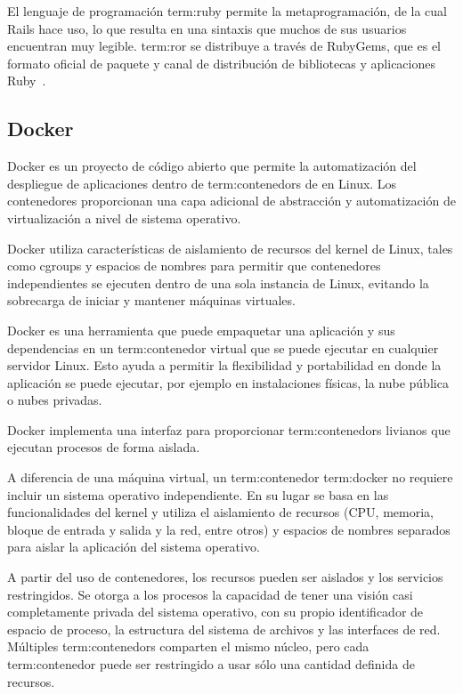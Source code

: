 El lenguaje de programación \gls{term:ruby} permite la metaprogramación, de la
cual Rails hace uso, lo que resulta en una sintaxis que muchos de sus usuarios
encuentran muy legible. \gls{term:ror} se distribuye a través de RubyGems, que
es el formato oficial de paquete y canal de distribución de bibliotecas y
aplicaciones Ruby~\cite{ror}.

\subsection{Docker}
\label{anexo:docker}

Docker es un proyecto de código abierto que permite la automatización del
despliegue de aplicaciones dentro de \glspl{term:contenedor} de 
en Linux. Los contenedores proporcionan una capa adicional de abstracción y
automatización de virtualización a nivel de sistema operativo.

Docker utiliza características de aislamiento de recursos del kernel de Linux,
tales como cgroups y espacios de nombres para permitir que contenedores
independientes se ejecuten dentro de una sola instancia de Linux, evitando la
sobrecarga de iniciar y mantener máquinas virtuales.

Docker es una herramienta que puede empaquetar una aplicación y sus
dependencias en un \gls{term:contenedor} virtual que se puede ejecutar en
cualquier servidor Linux. Esto ayuda a permitir la flexibilidad y portabilidad
en donde la aplicación se puede ejecutar, por ejemplo en instalaciones físicas,
la nube pública o nubes privadas.

Docker implementa una interfaz para proporcionar \glspl{term:contenedor}
livianos que ejecutan procesos de forma aislada.

A diferencia de una máquina virtual, un \gls{term:contenedor} \gls{term:docker}
no requiere incluir un sistema operativo independiente. En su lugar se basa en
las funcionalidades del kernel y utiliza el aislamiento de recursos (CPU,
memoria, bloque de entrada y salida y la red, entre otros) y espacios de
nombres separados para aislar la aplicación del sistema operativo.

A partir del uso de contenedores, los recursos pueden ser aislados y los
servicios restringidos. Se otorga a los procesos la capacidad de tener una
visión casi completamente privada del sistema operativo, con su propio
identificador de espacio de proceso, la estructura del sistema de archivos y
las interfaces de red. Múltiples \glspl{term:contenedor} comparten el mismo
núcleo, pero cada \gls{term:contenedor} puede ser restringido a usar sólo una
cantidad definida de recursos.

